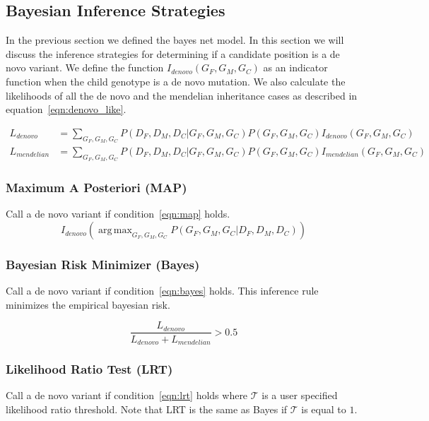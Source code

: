 \documentclass{article}
\DeclareMathOperator*{\argmax}{arg\,max}
\begin{document}
\subsection{Bayesian Inference Strategies}
In the previous section we defined the bayes net model. In this section we will discuss the inference strategies for determining if a candidate position is a de novo variant. We define the function $I_{denovo}(G_F,G_M,G_C)$ as an indicator function when the child genotype is a de novo mutation. We also calculate the likelihoods of all the de novo and the mendelian inheritance cases as described in equation~\ref{eqn:denovo_like}.

\begin{align}
\label{eqn:denovo_like}
L_{denovo} &= \sum_{G_F,G_M,G_C}P(D_F,D_M,D_C|G_F,G_M,G_C)P(G_F,G_M,G_C)I_{denovo}(G_F,G_M,G_C)\\
L_{mendelian} &= \sum_{G_F,G_M,G_C}P(D_F,D_M,D_C|G_F,G_M,G_C)P(G_F,G_M,G_C)I_{mendelian}(G_F,G_M,G_C)
\end{align}

\subsubsection{Maximum A Posteriori (MAP)} 
Call a de novo variant if condition~\ref{eqn:map} holds.
\begin{equation}
\label{eqn:map}
I_{denovo}(\argmax_{G_F,G_M,G_C} P(G_F,G_M,G_C|D_F,D_M,D_C))
\end{equation}

\subsubsection{Bayesian Risk Minimizer (Bayes)} 
Call a de novo variant if condition~\ref{eqn:bayes} holds. This inference rule minimizes the empirical bayesian risk.

\begin{equation}
\label{eqn:bayes}
\frac{L_{denovo}}{L_{denovo} + L_{mendelian}} > 0.5
\end{equation}

\subsubsection{Likelihood Ratio Test (LRT)} 
Call a de novo variant if condition~\ref{eqn:lrt} holds where $\mathcal{T}$ is a user specified likelihood ratio threshold. Note that LRT is the same as Bayes if $\mathcal{T}$ is equal to $1$.
\end{document}
